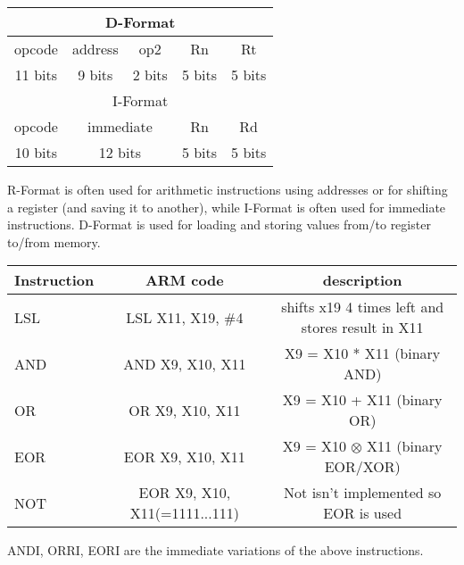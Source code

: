 \documentclass[a4paper]{scrartcl}
\begin{document}
            \begin{center}
                \begin{tabular}{|c|c|c|c|c|}
                    \hline
                    \multicolumn{5}{|c|}{D-Format} \\
                    \hline
                    opcode & address & op2 & Rn & Rt \\
                    \hline
                    11 bits & 9 bits & 2 bits & 5 bits & 5 bits \\
                    \hline \hline
                    \multicolumn{5}{|c|}{I-Format} \\
                    \hline
                    opcode & \multicolumn{2}{|c|}{immediate}  & Rn & Rd \\
                    \hline
                    10 bits & \multicolumn{2}{|c|}{12 bits} & 5 bits & 5 bits \\
                    \hline
                \end{tabular}
            \end{center}
            R-Format is often used for arithmetic instructions using addresses or for shifting a register (and saving it to another),
            while I-Format is often used for immediate instructions. D-Format is used for loading and storing values from/to register to/from memory.

            \begin{center}
                \begin{tabular}{|l|c|c|}
                    \hline
                    Instruction & ARM code & description \\
                    \hline
                    LSL & LSL X11, X19, \#4 & shifts x19 4 times left and stores result in X11 \\
                    \hline
                    AND & AND X9, X10, X11 & X9 = X10 * X11 (binary AND) \\
                    \hline
                    OR & OR X9, X10, X11 & X9 = X10 + X11 (binary OR) \\
                    \hline 
                    EOR & EOR X9, X10, X11 & X9 = X10 \(\otimes \) X11 (binary EOR/XOR) \\
                    \hline
                    NOT & EOR X9, X10, X11(=1111...111) & Not isn't implemented so EOR is used \\
                    \hline 
                \end{tabular}
            \end{center}
            ANDI, ORRI, EORI are the immediate variations of the above instructions.
\end{document}
